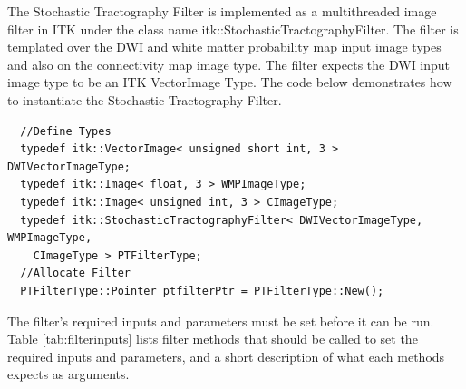 \documentclass{InsightArticle}
\begin{document}
The Stochastic Tractography Filter is implemented as a multithreaded image filter in ITK under the class name itk::StochasticTractographyFilter.  The filter is templated over the DWI and white matter probability map input image types and also on the connectivity map image type.  The filter expects the DWI input image type to be an ITK VectorImage Type.  The code below demonstrates how to instantiate the Stochastic Tractography Filter.
\begin{verbatim}
  //Define Types
  typedef itk::VectorImage< unsigned short int, 3 > DWIVectorImageType;
  typedef itk::Image< float, 3 > WMPImageType;
  typedef itk::Image< unsigned int, 3 > CImageType;
  typedef itk::StochasticTractographyFilter< DWIVectorImageType, WMPImageType,
    CImageType > PTFilterType;
  //Allocate Filter
  PTFilterType::Pointer ptfilterPtr = PTFilterType::New();
\end{verbatim}

The filter's required inputs and parameters must be set before it can be run.  Table \ref{tab:filterinputs} lists filter methods that should be called to set the required inputs and parameters,  and a short description of what each methods expects as arguments.
\end{document}
